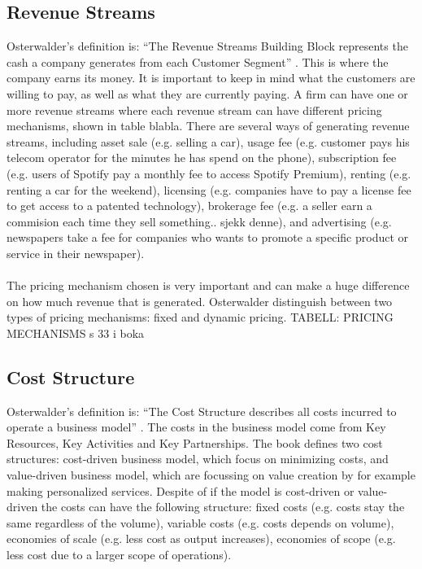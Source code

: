\subsection{Revenue Streams}
Osterwalder’s definition is: “The Revenue Streams Building Block represents the cash a company generates from each Customer Segment” \cite{osterwalder}. This is where the company earns its money. It is important to keep in mind what the customers are willing to pay, as well as what they are currently paying. A firm can have one or more revenue streams where each revenue stream can have different pricing mechanisms, shown in table blabla. There are several ways of generating revenue streams, including asset sale (e.g. selling a car), usage fee (e.g. customer pays his telecom operator for the minutes he has spend on the phone), subscription fee (e.g. users of Spotify pay a monthly fee to access Spotify Premium), renting (e.g. renting a car for the weekend), licensing (e.g. companies have to pay a license fee to get access to a patented technology), brokerage fee (e.g. a seller earn a commision each time they sell something.. sjekk denne), and advertising (e.g. newspapers take a fee for companies who wants to promote a specific product or service in their newspaper). \\ \\ 
The pricing mechanism chosen is very important and can make a huge difference on how much revenue that is generated. Osterwalder distinguish between two types of pricing mechanisms: fixed and dynamic pricing. 
TABELL: PRICING MECHANISMS s 33 i boka

\subsection{Cost Structure}
Osterwalder’s definition is: “The Cost Structure describes all costs incurred to operate a business model” \cite{osterwalder}. The costs in the business model come from Key Resources, Key Activities and Key Partnerships. The book \cite{osterwalder} defines two cost structures: cost-driven business model, which focus on minimizing costs, and value-driven business model, which are focussing on value creation by for example making personalized services. Despite of if the model is cost-driven or value-driven the costs can have the following structure: fixed costs (e.g. costs stay the same regardless of the volume), variable costs (e.g. costs depends on volume), economies of scale (e.g. less cost as output increases), economies of scope (e.g. less cost due to a larger scope of operations). 

